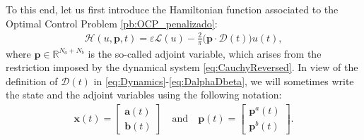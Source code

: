 \documentclass[twocolumn]{autart}    %
\begin{document}
To this end, let us first introduce the Hamiltonian function associated to the Optimal Control Problem \ref{pb:OCP_penalizado}:
\begin{align}\label{eq:hamil}
    \mathcal{H}(u,\bm{p},t) = \varepsilon \mathcal{L}(u) - \frac 2\pi\big(\bm{p} \cdot \bm{\mathcal{D}}(t)\big)u(t),
\end{align}
where $\bm{p}\in \mathbb{R}^{N_a+N_b}$ is the so-called adjoint variable, which arises from the restriction imposed by the dynamical system \eqref{eq:CauchyReversed}. In view of the definition of $\bm{\mathcal{D}}(t)$ in \eqref{eq:Dynamics}-\eqref{eq:DalphaDbeta}, we will sometimes write the state and the adjoint variables using the following notation:
\begin{align*}
  \bm{x}(t) = \begin{bmatrix} \bm{a}(t) \\ \bm{b}(t) \end{bmatrix} \quad \text{and}\quad
  \bm{p}(t) = \begin{bmatrix} \bm{p}^a(t) \\ \bm{p}^b(t) \end{bmatrix}.
\end{align*}
\end{document}

